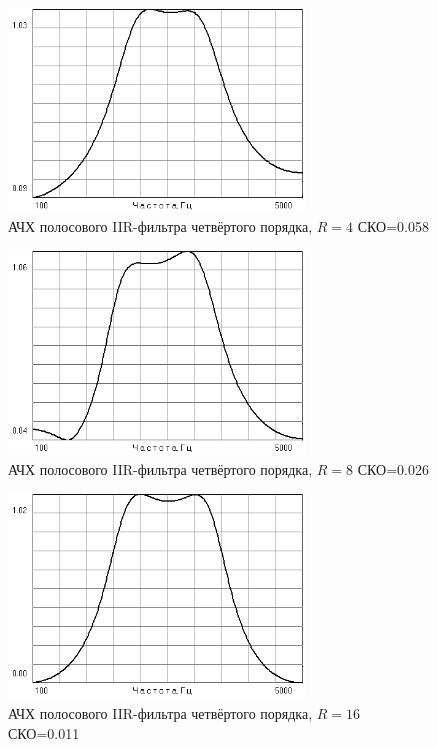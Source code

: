 \documentclass[a4paper,14pt]{extarticle}
\begin{document}
\begin{figure}[H]
  \centering
  \includegraphics[width=0.7\textwidth]{Z1_PPF/gain_IIR_4p_R4.png}
  \caption{АЧХ полосового IIR-фильтра четвёртого порядка, $R=4$ СКО=0.058}
  \label{fig:}
\end{figure}
\begin{figure}[H]
  \centering
  \includegraphics[width=0.7\textwidth]{Z1_PPF/gain_IIR_4p_R8.png}
  \caption{АЧХ полосового IIR-фильтра четвёртого порядка, $R=8$ СКО=0.026}
  \label{fig:}
\end{figure}
\begin{figure}[H]
  \centering
  \includegraphics[width=0.7\textwidth]{Z1_PPF/gain_IIR_4p_R16.png}
  \caption{АЧХ полосового IIR-фильтра четвёртого порядка, $R=16$ СКО=0.011}
  \label{fig:}
\end{figure}
\end{document}
